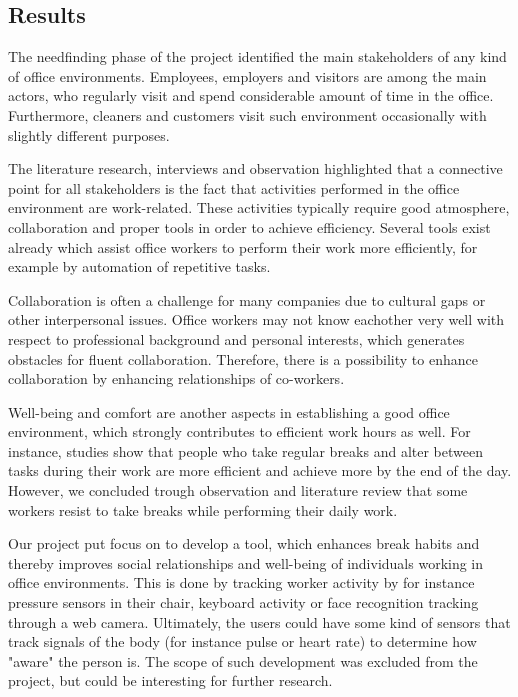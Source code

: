 \subsection{Results}
The needfinding phase of the project identified the main stakeholders of any kind of office environments. Employees, employers and visitors are among the main actors, who regularly visit and spend considerable amount of time in the office. Furthermore, cleaners and customers visit such environment occasionally with slightly different purposes. 

The literature research, interviews and observation highlighted that a connective point for all stakeholders is the fact that activities performed in the office environment are work-related. These activities typically require good atmosphere, collaboration and proper tools in order to achieve efficiency. Several tools exist already which assist office workers to perform their work more efficiently, for example by automation of repetitive tasks. 

Collaboration is often a challenge for many companies due to cultural gaps or other interpersonal issues. Office workers may not know eachother very well with respect to professional background and personal interests, which generates obstacles for fluent collaboration. Therefore, there is a possibility to enhance collaboration by enhancing relationships of co-workers.

Well-being and comfort are another aspects in establishing a good office environment, which strongly contributes to efficient work hours as well. For instance, studies show that people who take regular breaks and alter between tasks during their work are more efficient and achieve more by the end of the day. However, we concluded trough observation and literature review that some workers resist to take breaks while performing their daily work. 

Our project put focus on to develop a tool, which enhances break habits and thereby improves social relationships and well-being of individuals working in office environments. This is done by tracking worker activity by for instance pressure sensors in their chair, keyboard activity or face recognition tracking through a web camera. Ultimately, the users could have some kind of sensors that track signals of the body (for instance pulse or heart rate) to determine how "aware" the person is. The scope of such development was excluded from the project, but could be interesting for further research. 

